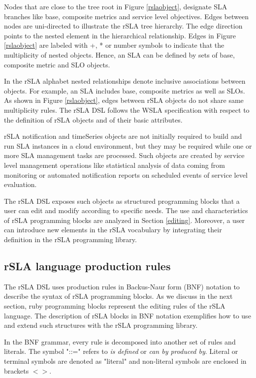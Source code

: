 Nodes that are close to the tree root in Figure \ref{rslaobject}, designate SLA branches like base, composite metrics and service level objectives. Edges between nodes are uni-directed to illustrate the rSLA tree hierarchy. The edge direction points to the nested element in the hierarchical relationship. 
Edges in Figure \ref{rslaobject} are labeled with +, * or number symbols to indicate that the multiplicity of nested objects. Hence, an SLA can be defined by sets of base, composite metric and SLO objects.

In the rSLA alphabet nested relationships denote inclusive associations between objects. For example, an SLA includes base, composite metrics as well as SLOs. As shown in Figure \ref{rslaobject}, edges between  rSLA objects do not share same multiplicity rules. The rSLA DSL follows the WSLA 
specification \cite{wsla} with respect to the definition of rSLA objects and of their basic attributes.

rSLA notification and timeSeries objects are not initially required to build and run SLA instances in a cloud environment, but they may be required while one or more SLA management tasks are processed. Such objects are created by service level management operations like statistical analysis of data coming from monitoring or automated notification reports on scheduled events of service level evaluation. 

The rSLA DSL exposes such objects as structured programming blocks that a user can edit and modify according to specific needs. The use and characteristics of rSLA programming blocks are analyzed in Section \ref{editing}. Moreover, a user can introduce new elements in the rSLA vocabulary by integrating their definition in the rSLA programming library. 

\subsection{rSLA language production rules}

The rSLA DSL uses production rules in Backus-Naur form (BNF) notation to describe the syntax of rSLA programming blocks. As we discuss in the next section, ruby programming blocks represent the editing rules of the rSLA language. The description of rSLA blocks in BNF notation exemplifies how to use and extend such structures with the rSLA programming library.

In the BNF grammar, every rule is decomposed into another set of rules and literals. The symbol "::=" refers to \textit{is defined} or \textit{can by produced by}. Literal or terminal symbols are denoted as "literal" and non-literal symbols are enclosed in brackets $<>$.

